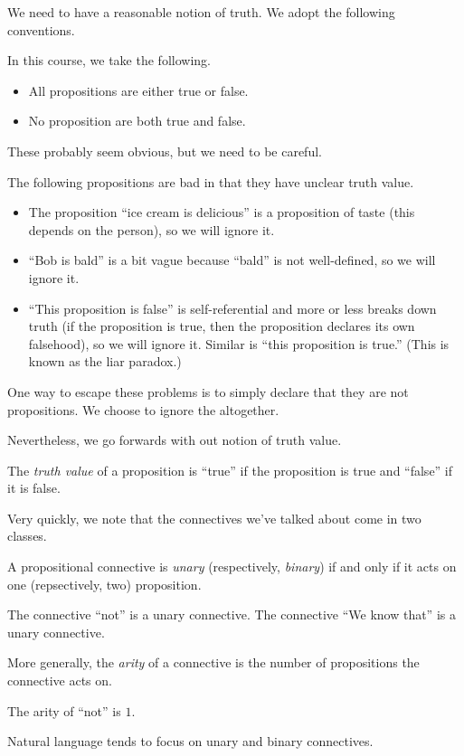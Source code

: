 We need to have a reasonable notion of truth. We adopt the following conventions.
\begin{convention}
	In this course, we take the following.
	\begin{itemize}
		\item All propositions are either true or false.
		\item No proposition are both true and false.
	\end{itemize}
\end{convention}
These probably seem obvious, but we need to be careful.
\begin{example}
	The following propositions are bad in that they have unclear truth value.
	\begin{itemize}
		\item The proposition ``ice cream is delicious'' is a proposition of taste (this depends on the person), so we will ignore it.
		\item ``Bob is bald'' is a bit vague because ``bald'' is not well-defined, so we will ignore it.
		\item ``This proposition is false'' is self-referential and more or less breaks down truth (if the proposition is true, then the proposition declares its own falsehood), so we will ignore it. Similar is ``this proposition is true.'' (This is known as the liar paradox.)
	\end{itemize}
	One way to escape these problems is to simply declare that they are not propositions. We choose to ignore the altogether.
\end{example}
Nevertheless, we go forwards with out notion of truth value.
\begin{definition}
	The \textit{truth value} of a proposition is ``true'' if the proposition is true and ``false'' if it is false.
\end{definition}

Very quickly, we note that the connectives we've talked about come in two classes.
\begin{definition}
	A propositional connective is \textit{unary} (respectively, \textit{binary}) if and only if it acts on one (repsectively, two) proposition.
\end{definition}
\begin{example}
	The connective ``not'' is a unary connective. The connective ``We know that'' is a unary connective.
\end{example}
\begin{definition}
	More generally, the \textit{arity} of a connective is the number of propositions the connective acts on.
\end{definition}
\begin{example}
	The arity of ``not'' is $1$.
\end{example}
Natural language tends to focus on unary and binary connectives.

